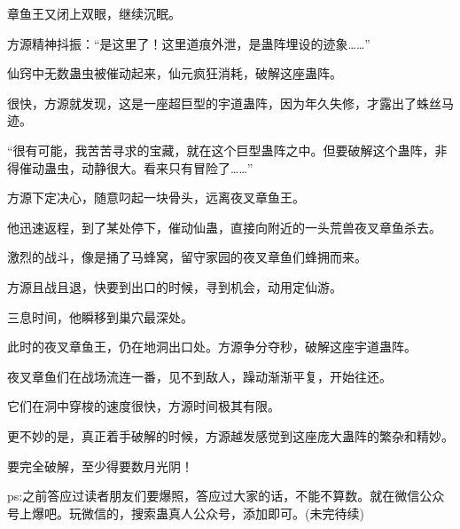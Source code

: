 \begin{this_body}
章鱼王又闭上双眼，继续沉眠。

方源精神抖振：“是这里了！这里道痕外泄，是蛊阵埋设的迹象……”

仙窍中无数蛊虫被催动起来，仙元疯狂消耗，破解这座蛊阵。

很快，方源就发现，这是一座超巨型的宇道蛊阵，因为年久失修，才露出了蛛丝马迹。

“很有可能，我苦苦寻求的宝藏，就在这个巨型蛊阵之中。但要破解这个蛊阵，非得催动蛊虫，动静很大。看来只有冒险了……”

方源下定决心，随意叼起一块骨头，远离夜叉章鱼王。

他迅速返程，到了某处停下，催动仙蛊，直接向附近的一头荒兽夜叉章鱼杀去。

激烈的战斗，像是捅了马蜂窝，留守家园的夜叉章鱼们蜂拥而来。

方源且战且退，快要到出口的时候，寻到机会，动用定仙游。

三息时间，他瞬移到巢穴最深处。

此时的夜叉章鱼王，仍在地洞出口处。方源争分夺秒，破解这座宇道蛊阵。

夜叉章鱼们在战场流连一番，见不到敌人，躁动渐渐平复，开始往还。

它们在洞中穿梭的速度很快，方源时间极其有限。

更不妙的是，真正着手破解的时候，方源越发感觉到这座庞大蛊阵的繁杂和精妙。

要完全破解，至少得要数月光阴！

ps:之前答应过读者朋友们要爆照，答应过大家的话，不能不算数。就在微信公众号上爆吧。玩微信的，搜索蛊真人公众号，添加即可。(未完待续)

\end{this_body}

